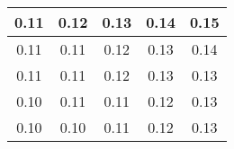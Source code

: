 \begin{large}\begin{tabular}{|c|c|c|c|c|}
\hline
0.11&0.12&0.13&0.14&0.15\\\hline
0.11&0.11&0.12&0.13&0.14\\\hline
0.11&0.11&0.12&0.13&0.13\\\hline
0.10&0.11&0.11&0.12&0.13\\\hline
0.10&0.10&0.11&0.12&0.13\\\hline
\end{tabular}
\end{large}